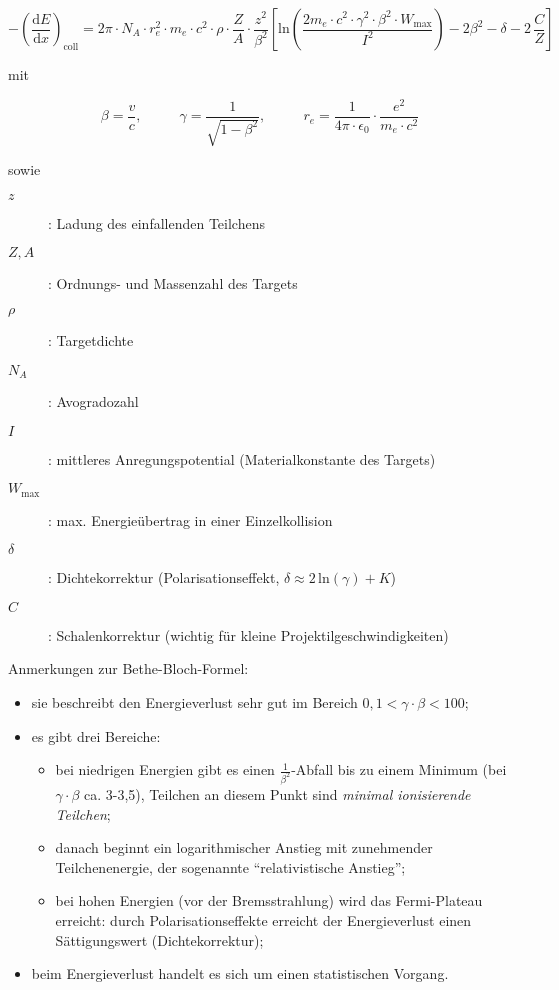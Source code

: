 \[-\left(\frac{\mathrm{d}E}{\mathrm{d}x}\right)_{\text{coll}} = 2\pi\cdot N_A\cdot r_e^2\cdot
m_e\cdot c^2 \cdot \rho\cdot \frac{Z}{A}\cdot \frac{z^2}{\beta^2}\left[ \text{ln} \left(
\frac{2m_e\cdot c^2 \cdot\gamma^2 \cdot\beta^2 \cdot W_{\text{max}}}{I^2} \right) -2\beta^2 -\delta
-2\,\frac{C}{Z} \right]\]

mit 

\[\beta =
\frac{v}{c},~~~~~~~~~~~~\gamma=\frac{1}{\sqrt{1-\beta^2}},~~~~~~~~~~~~
r_e=\frac{1}{4\pi\cdot\epsilon_0}\cdot\frac{e^2}{m_e\cdot c^2}\]

sowie
\begin{description}
\item[$z$]: Ladung des einfallenden Teilchens
\item[$Z, A$]: Ordnungs- und Massenzahl des Targets
\item[$\rho$]: Targetdichte
\item[$N_A$]: Avogradozahl
\item[$I$]: mittleres Anregungspotential (Materialkonstante des Targets)
\item[$W_{\text{max}}$]: max. Energieübertrag in einer Einzelkollision
\item[$\delta$]: Dichtekorrektur (Polarisationseffekt, $\delta \approx 2\,\text{ln}(\gamma)+K$)
\item[$C$]: Schalenkorrektur (wichtig für kleine Projektilgeschwindigkeiten)
\end{description}


Anmerkungen zur Bethe-Bloch-Formel:
\begin{itemize}
  \item sie beschreibt den Energieverlust sehr gut im Bereich $0{,}1 < \gamma\cdot\beta < 100$;
  \item es gibt drei Bereiche:
  			\begin{itemize}
  			  \item bei niedrigen Energien gibt es einen $\frac{1}{\beta^2}$-Abfall bis zu einem Minimum
  			  (bei $\gamma\cdot\beta$ ca. 3-3,5), Teilchen an diesem Punkt sind \textit{minimal ionisierende Teilchen};
  			  \item danach beginnt ein logarithmischer Anstieg mit zunehmender Teilchenenergie, der
  			  sogenannte "`relativistische Anstieg"';
  			  \item bei hohen Energien (vor der Bremsstrahlung) wird das Fermi-Plateau erreicht: durch
  			  Polarisationseffekte erreicht der Energieverlust  einen Sättigungswert (Dichtekorrektur);
  			  \end{itemize}
  \item beim Energieverlust handelt es sich um einen statistischen Vorgang.
\end{itemize}

